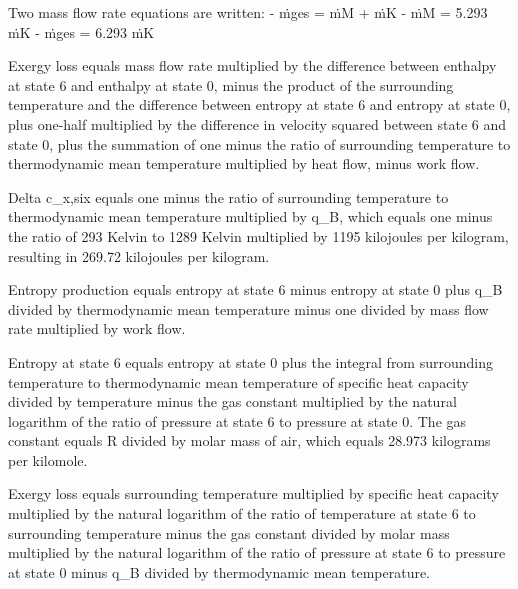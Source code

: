 Two mass flow rate equations are written:  
- ṁges = ṁM + ṁK  
- ṁM = 5.293 ṁK  
- ṁges = 6.293 ṁK

Exergy loss equals mass flow rate multiplied by the difference between enthalpy at state 6 and enthalpy at state 0, minus the product of the surrounding temperature and the difference between entropy at state 6 and entropy at state 0, plus one-half multiplied by the difference in velocity squared between state 6 and state 0, plus the summation of one minus the ratio of surrounding temperature to thermodynamic mean temperature multiplied by heat flow, minus work flow.

Delta c_x,six equals one minus the ratio of surrounding temperature to thermodynamic mean temperature multiplied by q_B, which equals one minus the ratio of 293 Kelvin to 1289 Kelvin multiplied by 1195 kilojoules per kilogram, resulting in 269.72 kilojoules per kilogram.

Entropy production equals entropy at state 6 minus entropy at state 0 plus q_B divided by thermodynamic mean temperature minus one divided by mass flow rate multiplied by work flow.

Entropy at state 6 equals entropy at state 0 plus the integral from surrounding temperature to thermodynamic mean temperature of specific heat capacity divided by temperature minus the gas constant multiplied by the natural logarithm of the ratio of pressure at state 6 to pressure at state 0. The gas constant equals R divided by molar mass of air, which equals 28.973 kilograms per kilomole.

Exergy loss equals surrounding temperature multiplied by specific heat capacity multiplied by the natural logarithm of the ratio of temperature at state 6 to surrounding temperature minus the gas constant divided by molar mass multiplied by the natural logarithm of the ratio of pressure at state 6 to pressure at state 0 minus q_B divided by thermodynamic mean temperature.